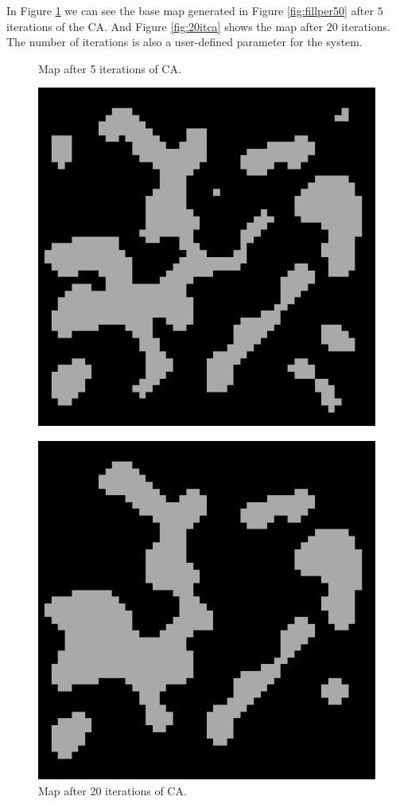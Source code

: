 In Figure \ref{fig:5itca} we can see the base map generated in Figure \ref{fig:fillper50} after \(5\) iterations of the CA. And Figure \ref{fig:20itca} shows the map after \(20\) iterations. The number of iterations is also a user-defined parameter for the system.

\begin{figure}[h]
  \centering
  \begin{minipage}[b]{0.4\textwidth}
    \caption{Map after 5 iterations of CA.}
    \includegraphics[width=\textwidth]{images/development/5it_ca.png}
    \label{fig:5itca}
  \end{minipage}
  \hfill
  \begin{minipage}[b]{0.4\textwidth}
    \caption{Map after 20 iterations of CA.}
    \includegraphics[width=\textwidth]{images/development/20it_ca.png}

\end{minipage}
\end{figure}

